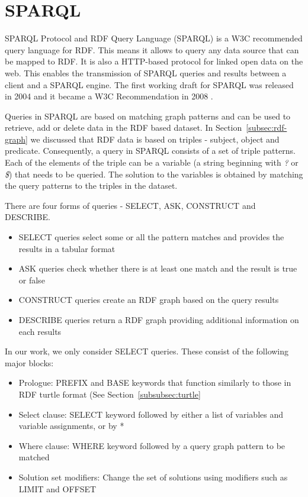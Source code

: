 \section{SPARQL}
SPARQL Protocol and RDF Query Language (SPARQL) is a W3C recommended query language for RDF. This means it allows to query any data source that can be mapped to RDF. It is also a HTTP-based protocol for linked open data on the web. This enables the transmission of SPARQL queries and results between a client and a SPARQL engine. The first working draft for SPARQL was released in 2004 and it became a W3C Recommendation in 2008 \cite{Perez2009}. 

Queries in SPARQL are based on matching graph patterns and can be used to retrieve, add or delete data in the RDF based dataset. In Section~\ref{subsec:rdf-graph} we discussed that RDF data is based on triples - subject, object and predicate. Consequently, a query in SPARQL consists of a set of triple patterns. Each of the elements of the triple can be a variable (a string beginning with \textit{?} or \textit{\$}) that needs to be queried. The solution to the variables is obtained by matching the query patterns to the triples in the dataset.

There are four forms of queries - SELECT, ASK, CONSTRUCT and DESCRIBE. 
\begin{itemize}
\item SELECT queries select some or all the pattern matches and provides the results in a tabular format
\item ASK queries check whether there is at least one match and the result is true or false
\item CONSTRUCT queries create an RDF graph based on the query results
\item DESCRIBE queries return a RDF graph providing additional information on each results
\end{itemize}

In our work, we only consider SELECT queries. These consist of the following major blocks:
\begin{itemize}
\item Prologue: PREFIX and BASE keywords that function similarly to those in RDF turtle format (See Section~\ref{subsubsec:turtle}
\item Select clause: SELECT keyword followed by either a list of variables and variable assignments, or by *
\item Where clause: WHERE keyword followed by a query graph pattern to be matched
\item Solution set modifiers: Change the set of solutions using modifiers such as LIMIT and OFFSET
\end{itemize}

